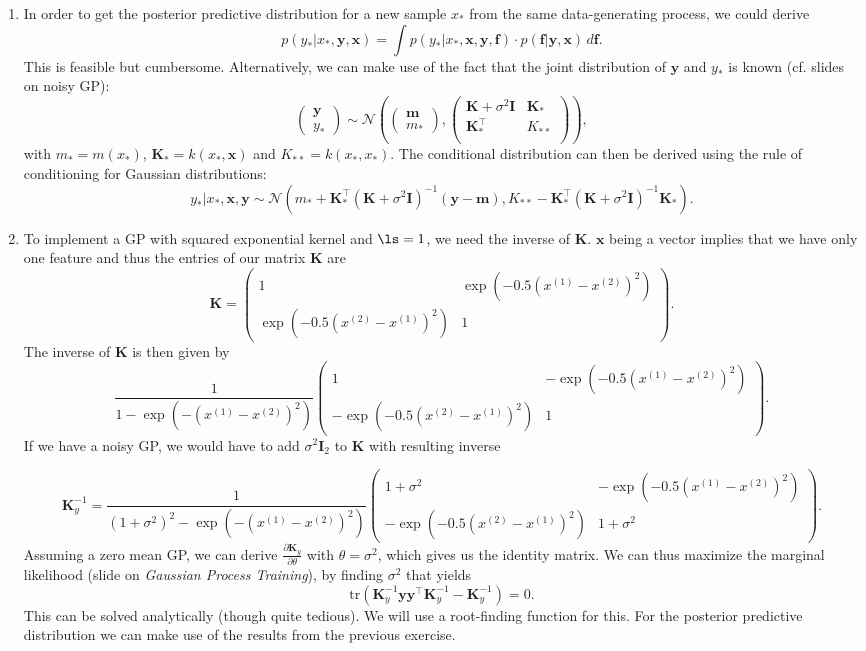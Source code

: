 \documentclass[a4paper]{article}
\begin{document}
{\begin{enumerate}
\item In order to get the posterior predictive distribution for a new sample $x_*$ from the same data-generating process, we could derive $$p(y_* | x_*, \bm{y}, \bm{x}) = \int p(y_*|x_*, \bm{x}, \bm{y}, \bm{f}) \cdot p(\bm{f}|\bm{y},\bm{x}) \,d\bm{f}.$$ This is feasible but cumbersome. Alternatively, we can make use of the fact that the joint distribution of $\bm{y}$ and $y_*$ is known (cf. slides on noisy GP): 
$$\begin{pmatrix} \bm{y} \\ y_* \end{pmatrix} \sim \mathcal{N}\left( \begin{pmatrix} \bm{m} \\ m_* \end{pmatrix}, 
\begin{pmatrix} 
\bm{K} + \sigma^2 \bm{I} & \bm{K}_*\\
\bm{K}^\top_* & K_{**}\\
\end{pmatrix}
\right),$$
with $m_* = m(x_*)$, $\bm{K}_* = k(x_*, \bm{x})$ and $K_{**} = k(x_*,x_*)$.
The conditional distribution can then be derived using the rule of conditioning for Gaussian distributions: $$y_* | x_*, \bm{x}, \bm{y} \sim \mathcal{N}(m_* + \bm{K}^\top_* (\bm{K} + \sigma^2 \bm{I})^{-1}(\bm{y}-\bm{m}), K_{**} - \bm{K}^\top_* (\bm{K} + \sigma^2 \bm{I})^{-1} \bm{K}_*).$$
\item To implement a GP with squared exponential kernel and $\ls = 1$, we need the inverse of $\bm{K}$. $\bm{x}$ being a vector implies that we have only one feature and thus the entries of our matrix $\bm{K}$ are 
$$
\bm{K} = \begin{pmatrix} 1 & \exp(-0.5 (x^{(1)} - x^{(2)})^2) \\ \exp(-0.5 (x^{(2)} - x^{(1)})^2) & 1 \end{pmatrix}.
$$
The inverse of $\bm{K}$ is then given by $$
\frac{1}{1-\exp(-(x^{(1)} - x^{(2)})^2)} \begin{pmatrix} 1 & -\exp(-0.5 (x^{(1)} - x^{(2)})^2) \\ -\exp(-0.5 (x^{(2)} - x^{(1)})^2) & 1 \end{pmatrix}.
$$
If we have a noisy GP, we would have to add $\sigma^2 \bm{I}_2$ to $\bm{K}$ with resulting inverse 

$$
\bm{K}_y^{-1} = \frac{1}{(1+\sigma^2)^2-\exp(-(x^{(1)} - x^{(2)})^2)} \begin{pmatrix} 1+\sigma^2 & -\exp(-0.5 (x^{(1)} - x^{(2)})^2) \\ -\exp(-0.5 (x^{(2)} - x^{(1)})^2) & 1+\sigma^2 \end{pmatrix}.
$$
Assuming a zero mean GP, we can derive $\frac{\partial \bm{K}_y}{\partial \theta}$ with $\theta = \sigma^2$, which gives us the identity matrix. We can thus maximize the marginal likelihood (slide on \emph{Gaussian Process Training}), by finding $\sigma^2$ that yields 
$$\text{tr}\left( \bm{K}_y^{-1} \bm{y} \bm{y}^\top \bm{K}_y^{-1} - \bm{K}_y^{-1} \right) = 0.$$
This can be solved analytically (though quite tedious). We will use a root-finding function for this. For the posterior predictive distribution we can make use of the results from the previous exercise.


\end{enumerate}}
\end{document}
